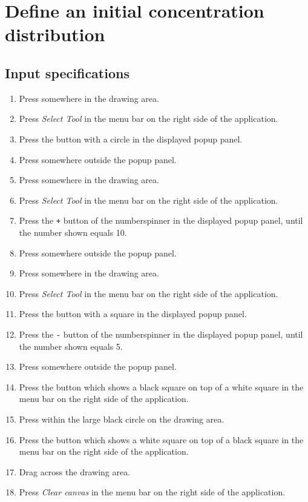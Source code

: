 \section{Define an initial concentration distribution}

\subsection*{Input specifications}
\begin{enumerate}
\item Press somewhere in the drawing area.
\item Press \emph{Select Tool} in the menu bar on the right side of the application.
\item Press the button with a circle in the displayed popup panel.
\item Press somewhere outside the popup panel.
\item Press somewhere in the drawing area.

\item Press \emph{Select Tool} in the menu bar on the right side of the application.
\item Press the \texttt{+} button of the numberspinner in the displayed popup panel, until the number shown equals 10.
\item Press somewhere outside the popup panel.
\item Press somewhere in the drawing area.
\item Press \emph{Select Tool} in the menu bar on the right side of the application. 

\item Press the button with a square in the displayed popup panel.
\item Press the \texttt{-} button of the numberspinner in the displayed popup panel, until the number shown equals 5.
\item Press somewhere outside the popup panel.
\item Press the button which shows a black square on top of a white square in the menu bar on the right side of the application. 
\item Press within the large black circle on the drawing area.

\item Press the button which shows a white square on top of a black square in the menu bar on the right side of the application. 
\item Drag across the drawing area.
\item Press \emph{Clear canvas} in the menu bar on the right side of the application. 
\end{enumerate}


